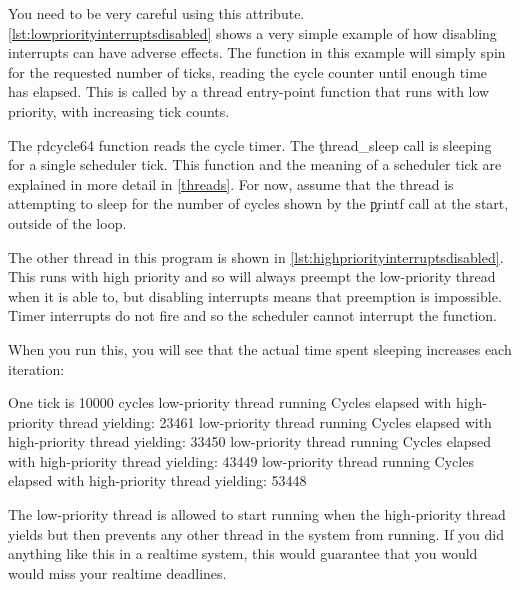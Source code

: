 {{You need to be very careful using this attribute.
\ref{lst:lowpriorityinterruptsdisabled} shows a very simple example of how disabling interrupts can have adverse effects.
The  function in this example will simply spin for the requested number of ticks, reading the cycle counter until enough time has elapsed.
This is called by a thread entry-point function that runs with low priority, with increasing tick counts.

The \c{rdcycle64} function reads the cycle timer.
The \c{thread_sleep} call is sleeping for a single scheduler tick.
This function and the meaning of a scheduler tick are explained in more detail in \ref{threads}.
For now, assume that the thread is attempting to sleep for the number of cycles shown by the \c{printf} call at the start, outside of the loop.

\codelisting[filename=examples/interrupts_disabled/interrupts.cc,marker=low,label=lst:lowpriorityinterruptsdisabled,caption="A low-priority thread that uses an interrupts-disabled function to consume CPU."]{}

The other thread in this program is shown in \ref{lst:highpriorityinterruptsdisabled}.
This runs with high priority and so will always preempt the low-priority thread when it is able to, but disabling interrupts means that preemption is impossible.
Timer interrupts do not fire and so the scheduler cannot interrupt the function.

\codelisting[filename=examples/interrupts_disabled/interrupts.cc,marker=high,label=lst:highpriorityinterruptsdisabled,caption="A high-priority thread that is starved but an interrupts-disabled function called from a low-priority thread."]{}

When you run this, you will see that the actual time spent sleeping increases each iteration:

\begin{console}
One tick is 10000 cycles
low-priority thread running
Cycles elapsed with high-priority thread yielding: 23461
low-priority thread running
Cycles elapsed with high-priority thread yielding: 33450
low-priority thread running
Cycles elapsed with high-priority thread yielding: 43449
low-priority thread running
Cycles elapsed with high-priority thread yielding: 53448
\end{console}

The low-priority thread is allowed to start running when the high-priority thread yields but then prevents any other thread in the system from running.
If you did anything like this in a realtime system, this would guarantee that you would would miss your realtime deadlines.

}}
